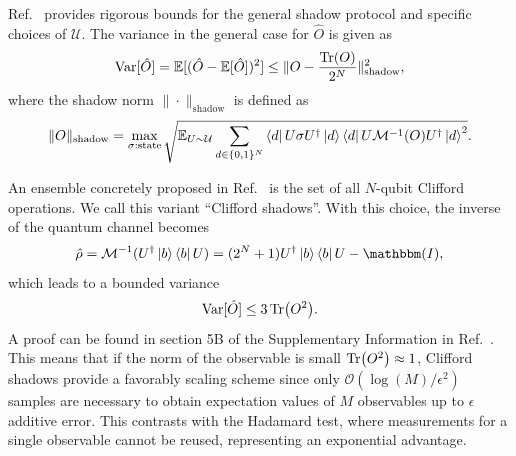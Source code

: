 \documentclass[../main.tex]{subfiles}
\begin{document}
Ref.~\cite{huang2020predicting} provides rigorous bounds for the general shadow protocol and specific choices of  $\mathcal{U}$. The variance in the general case for $\hat{O}$ is given as
\begin{equation}
    \mathrm{Var}[\hat{O}] = \mathbb{E}[(\hat{O} - \mathbb{E}[\hat{O}])^2] \leq \| O - \frac{\Tr (O)}{2^N} \|_{\mathrm{shadow}}^2,
\end{equation} where the shadow norm $\| \cdot\|_\mathrm{shadow}$ is defined as
\begin{equation}
    \|O\|_\mathrm{shadow} = \max_{\sigma:\mathrm{state}} \sqrt{\mathbb{E}_{U \sim \mathcal{U}} \sum_{d \in \{0,1\}^N} \bra{d} U \sigma U^\dagger \ket{d} \bra{d} U \mathcal{M}^{-1}(O) U^\dagger \ket{d}^2  }.
\end{equation}

An ensemble concretely proposed in  Ref.~\cite{huang2020predicting} is the set of all $N$-qubit Clifford operations. We call this variant ``Clifford shadows''. With this choice, the inverse of the quantum channel becomes
\begin{equation}
  \hat{\rho} =  \mathcal{M}^{-1} (U^\dagger \ket{b}\bra{b}U) = (2^N + 1) U^\dagger \ket{b}\bra{b} U - \mathbbm(I),
\end{equation} which leads to a bounded variance 
\begin{equation}\label{eq:clifford_var}
    \mathrm{Var}[\hat{O}] \leq 3 \Tr(O^2).
\end{equation} A proof can be found in section 5B of the Supplementary Information in  Ref.~\cite{huang2020predicting}. This means that if the norm of the observable is small $\Tr(O^2) \approx 1$, Clifford shadows provide a favorably scaling scheme since only $\mathcal{O}(\log(M)/\epsilon^2)$ samples are necessary to obtain expectation values of $M$ observables up to $\epsilon$ additive error. This contrasts with the Hadamard test, where measurements for a single observable cannot be reused, representing an exponential advantage. 
\end{document}
